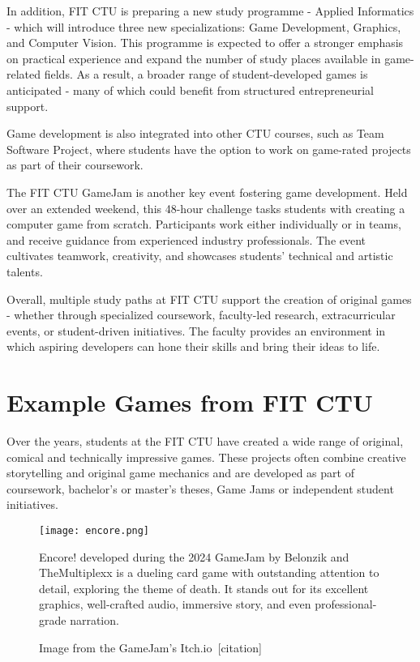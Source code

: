 In addition, FIT CTU is preparing a new study programme - Applied Informatics - which will introduce three new specializations: Game Development, Graphics, and Computer Vision. This programme is expected to offer a stronger emphasis on practical experience and expand the number of study places available in game-related fields. As a result, a broader range of student-developed games is anticipated - many of which could benefit from structured entrepreneurial support.

Game development is also integrated into other CTU courses, such as Team Software Project, where students have the option to work on game-rated projects as part of their coursework.

The FIT CTU GameJam is another key event fostering game development. Held over an extended weekend, this 48-hour challenge tasks students with creating a computer game from scratch. Participants work either individually or in teams, and receive guidance from experienced industry professionals. The event cultivates teamwork, creativity, and showcases students’ technical and artistic talents.

Overall, multiple study paths at FIT CTU support the creation of original games - whether through specialized coursework, faculty-led research, extracurricular events, or student-driven initiatives. The faculty provides an environment in which aspiring developers can hone their skills and bring their ideas to life.

\section{Example Games from FIT CTU}\label{sec:example-games}
Over the years, students at the FIT CTU have created a wide range of original, comical and technically impressive games. These projects often combine creative storytelling and original game mechanics and are developed as part of coursework, bachelor’s or master’s theses, Game Jams or independent student initiatives.

\begin{figure}[H]
    \texttt{[image: encore.png]}
    \caption{Image from the GameJam's Itch.io~[citation]}
    \label{fig:encore-picture}
    Encore! developed during the 2024 GameJam by Belonzik and TheMultiplexx is a dueling card game with outstanding attention to detail, exploring the theme of death. It stands out for its excellent graphics, well-crafted audio, immersive story, and even professional-grade narration.
\end{figure}

